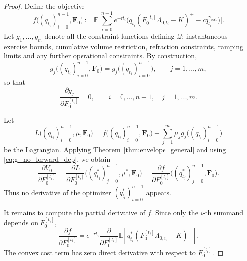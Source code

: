 \documentclass[10pt,a4paper,reqno]{amsart}
\newcommand{\<}{\langle}
\renewcommand{\>}{\rangle}
\theoremstyle{example}
\begin{document}
\begin{proof}
Define the objective
\begin{equation}
\label{eq:f_objective_hedge}
f\big((q_{t_i})_{i=0}^{n-1},\mathbf{F}_0\big)
:=
\mathbb{E}\!\Bigg[
\sum_{i=0}^{n-1}
e^{-r t_i}
\Big(
q_{t_i}(F_0^{[t_i]}\Lambda_{0,t_i}-K)^+
-
c q_{t_i}^{\gamma_{\mathrm{cost}}}
\Big)
\Bigg].
\end{equation}
Let $g_1,\dots,g_m$ denote all the constraint functions defining $\mathcal{Q}$:
instantaneous exercise bounds, cumulative volume restriction, refraction constraints,
ramping limits and any further operational constraints. By construction,
\[
g_j\big((q_{t_i})_{i=0}^{n-1},\mathbf{F}_0\big)
=
g_j\big((q_{t_i})_{i=0}^{n-1}\big),
\qquad
j=1,\dots,m,
\]
so that
\begin{equation}
\label{eq:g_no_forward_dep}
\frac{\partial g_j}{\partial F_0^{[t_i]}} = 0,
\qquad
i=0,\dots,n-1,\quad j=1,\dots,m.
\end{equation}

Let
\[
L\big((q_{t_i})_{i=0}^{n-1},\mu,\mathbf{F}_0\big)
=
f\big((q_{t_i})_{i=0}^{n-1},\mathbf{F}_0\big)
+
\sum_{j=1}^m \mu_j g_j\big((q_{t_i})_{i=0}^{n-1}\big)
\]
be the Lagrangian. Applying Theorem~\ref{thm:envelope_general} and using
\eqref{eq:g_no_forward_dep}, we obtain
\begin{equation}
\label{eq:envelope_step_time0}
\frac{\partial V_0}{\partial F_0^{[t_i]}}
=
\frac{\partial L}{\partial F_0^{[t_i]}}
\big((q_{t_j}^*)_{j=0}^{n-1},\mu^*,\mathbf{F}_0\big)
=
\frac{\partial f}{\partial F_0^{[t_i]}}
\big((q_{t_j}^*)_{j=0}^{n-1},\mathbf{F}_0\big).
\end{equation}
Thus no derivative of the optimizer $(q_{t_i}^*)_{i=0}^{n-1}$ appears.

It remains to compute the partial derivative of $f$. Since only the $i$-th summand depends on
$F_0^{[t_i]}$,
\[
\frac{\partial f}{\partial F_0^{[t_i]}}
=
e^{-r t_i}
\frac{\partial}{\partial F_0^{[t_i]}}
\mathbb{E}\!\left[
q_{t_i}^*
(F_0^{[t_i]}\Lambda_{0,t_i}-K)^+
\right].
\]
The convex cost term has zero direct derivative with respect to $F_0^{[t_i]}$.


\end{proof}
\end{document}
